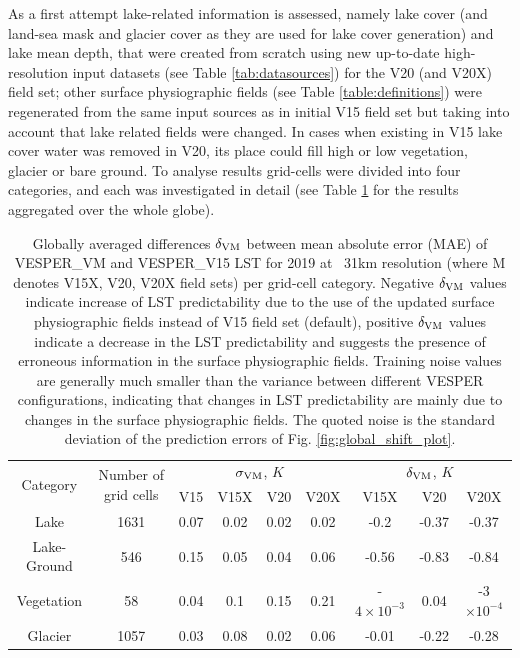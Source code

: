\documentclass[hess, twostagejnl]{copernicus}
\begin{document}
As a first attempt lake-related information is assessed, namely lake cover (and land-sea mask and glacier cover as they are used for lake cover generation) and lake mean depth, that were created from scratch using new up-to-date high-resolution input datasets (see Table \ref{tab:datasources}) for the V20 (and V20X) field set; other surface physiographic fields (see Table \ref{table:definitions}) were regenerated from the same input sources as in initial V15 field set but taking into account that lake related fields were changed. In cases when existing in V15 lake cover water was removed in V20, its place could fill high or low vegetation, glacier or bare ground. To analyse results grid-cells were divided into four categories, and each was investigated in detail (see Table \ref{tab:categorisation} for the results aggregated over the whole globe).
\begin{table}
	\begin{tabular}{ccccccccc}
		\toprule
		\multirow{2}{*}{Category} & \multirow{2}{*}{Number of grid cells} & 	\multicolumn{4}{c}{$\sigma_{\rm VM}$, $K$} &\multicolumn{3}{c}{$\delta_{\rm VM}$, $K$} \\  
		&&V15  & V15X & V20 & V20X & V15X &V20 & V20X  \\
		\hline 
		Lake&1631 & 0.07& 0.02& 0.02& 0.02&  -0.2 & -0.37&-0.37 \\
		Lake-Ground&546 & 0.15 &0.05& 0.04& 0.06 & -0.56 &-0.83& -0.84 \\
		Vegetation&58 & 0.04 &0.1& 0.15& 0.21&  -$4 \times 10^{-3}$&0.04 & -3 $\times 10^{-4}$ \\
		Glacier&1057 & 0.03& 0.08& 0.02& 0.06 & -0.01& -0.22& -0.28  \\
		\bottomrule
	\end{tabular}
	\caption{Globally averaged differences $\delta_{\rm VM}$ between mean absolute error (MAE) of VESPER\_VM  and VESPER\_V15 LST for 2019 at ~31km resolution (where M denotes V15X, V20, V20X field sets) per grid-cell category. Negative $\delta_{\rm VM}$ values indicate increase of LST predictability due to the use of the updated surface physiographic fields instead of V15 field set (default), positive $\delta_{\rm VM}$ values indicate a decrease in the LST predictability and suggests the presence of erroneous information in the surface physiographic fields. Training noise values are generally much smaller than the variance between different VESPER configurations, indicating that changes in LST predictability are mainly due to changes in the surface physiographic fields. The quoted noise is the standard deviation of the prediction errors of Fig. \ref{fig:global_shift_plot}.}
	\label{tab:categorisation}
\end{table}	
\end{document}
